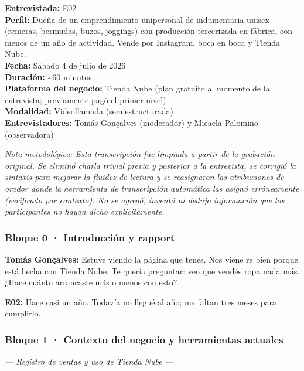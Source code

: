 ﻿
\noindent\textbf{Entrevistada:} E02\\
\noindent\textbf{Perfil:} Dueña de un emprendimiento unipersonal de indumentaria unisex (remeras, bermudas, buzos, joggings) con producción tercerizada en fábrica, con menos de un año de actividad. Vende por Instagram, boca en boca y Tienda Nube.\\
\noindent\textbf{Fecha:} Sábado 4 de julio de 2026\\
\noindent\textbf{Duración:} \textasciitilde60 minutos\\
\noindent\textbf{Plataforma del negocio:} Tienda Nube (plan gratuito al momento de la entrevista; previamente pagó el primer nivel)\\
\noindent\textbf{Modalidad:} Videollamada (semiestructurada)\\
\noindent\textbf{Entrevistadores:} Tomás Gonçalves (moderador) y Micaela Palomino (observadora)

\begin{framed}
\small\noindent\textit{Nota metodológica: Esta transcripción fue limpiada a partir de la grabación original. Se eliminó charla trivial previa y posterior a la entrevista, se corrigió la sintaxis para mejorar la fluidez de lectura y se reasignaron las atribuciones de orador donde la herramienta de transcripción automática las asignó erróneamente (verificado por contexto). No se agregó, inventó ni dedujo información que los participantes no hayan dicho explícitamente.}
\end{framed}

\subsubsection*{Bloque 0 · Introducción y rapport}

\noindent\textbf{Tomás Gonçalves:} Estuve viendo la página que tenés. Nos viene re bien porque está hecha con Tienda Nube. Te quería preguntar: veo que vendés ropa nada más. ¿Hace cuánto arrancaste más o menos con esto?

\noindent\textbf{E02:} Hace casi un año. Todavía no llegué al año; me faltan tres meses para cumplirlo.

\subsubsection*{Bloque 1 · Contexto del negocio y herramientas actuales}

\noindent\textit{--- Registro de ventas y uso de Tienda Nube ---}

